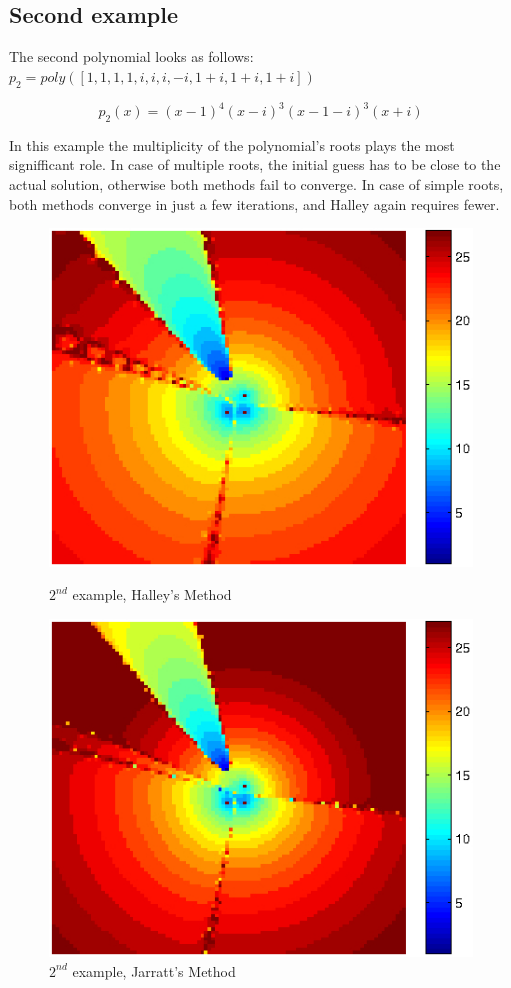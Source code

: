 \documentclass{article}
\begin{document}
\subsection{Second example}
The second polynomial looks as follows: $p_2 = poly([1,1,1,1,i,i,i,-i,1+i,1+i,1+i])$

\[ p_2(x) = (x-1)^4(x-i)^3(x-1-i)^3(x+i) \]

In this example the multiplicity of the polynomial's roots plays the most signifficant role. In case
of multiple roots, the initial guess has to be close to the actual solution, otherwise both methods
fail to converge. In case of simple roots, both methods converge in just a few iterations, and
Halley again requires fewer.

\begin{figure}[H]
	\begin{minipage}[b]{0.48\linewidth}
		\centering
		\includegraphics[scale=0.68]{example2halley.jpg}
		\caption{$2^{nd}$ example, Halley's Method}
		\label{fig:figure3}
	\end{minipage}
	\hspace{0.5cm}
	\begin{minipage}[b]{0.48\linewidth}
		\centering
		\includegraphics[scale=0.68]{example2jarratt.jpg}
		\caption{$2^{nd}$ example, Jarratt's Method}
		\label{fig:figure4}
	\end{minipage}
\end{figure}
\end{document}
